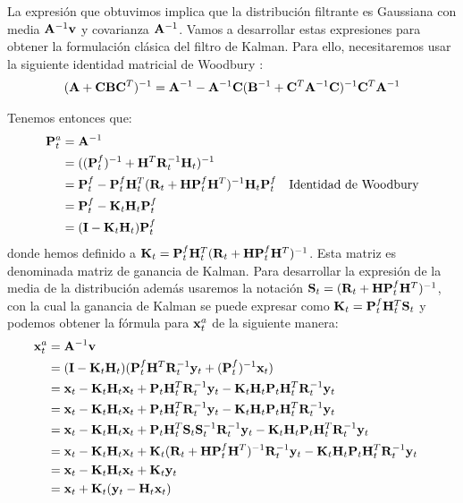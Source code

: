 La expresión que obtuvimos implica que la distribución filtrante es Gaussiana con media $\mathbf{A}^{-1}\mathbf{v}$ y covarianza $\mathbf{A}^{-1}$. Vamos a desarrollar estas expresiones para obtener la formulación clásica del filtro de Kalman. Para ello, necesitaremos usar la siguiente identidad matricial de Woodbury \citep{Golub1996}:
\begin{align*}
    (\mathbf{A} + \mathbf{C} \mathbf{B} \mathbf{C}^T)^{-1} = \mathbf{A}^{-1} - \mathbf{A}^{-1} \mathbf{C} (\mathbf{B}^{-1} + \mathbf{C}^T \mathbf{A}^{-1} \mathbf{C})^{-1} \mathbf{C}^T \mathbf{A}^{-1}
\end{align*}

Tenemos entonces que:
\begin{align*}
    \mathbf{P}_t^a &= \mathbf{A}^{-1} && \\
    &= ((\mathbf{P}_t^f)^{-1} + \mathbf{H}^T \mathbf{R}_t^{-1} \mathbf{H}_t)^{-1} && \\
    &= \mathbf{P}_t^f - \mathbf{P}_t^f \mathbf{H}_t^T (\mathbf{R}_t + \mathbf{H} \mathbf{P}_t^f \mathbf{H}^T)^{-1} \mathbf{H}_t \mathbf{P}_t^f && \text{Identidad de Woodbury}\\
    &= \mathbf{P}_t^f - \mathbf{K}_t \mathbf{H}_t \mathbf{P}_t^f && \\
    &= (\mathbf{I} - \mathbf{K}_t \mathbf{H}_t) \mathbf{P}_t^f && \\
\end{align*}
donde hemos definido a $\mathbf{K}_t = \mathbf{P}_t^f \mathbf{H}_t^T (\mathbf{R}_t + \mathbf{H} \mathbf{P}_t^f \mathbf{H}^T)^{-1}$. Esta matriz es denominada matriz de ganancia de Kalman. Para desarrollar la expresión de la media de la distribución además usaremos la notación $\mathbf{S}_t = (\mathbf{R}_t + \mathbf{H} \mathbf{P}_t^f \mathbf{H}^T)^{-1}$, con la cual la ganancia de Kalman se puede expresar como $\mathbf{K}_t = \mathbf{P}_t^f \mathbf{H}_t^T \mathbf{S}_t$ y podemos obtener la fórmula para $\mathbf{x}_t^a$ de la siguiente manera:
\begin{align*}
    \mathbf{x}_t^a &= \mathbf{A}^{-1} \mathbf{v} && \\
    &= (\mathbf{I} - \mathbf{K}_t \mathbf{H}_t) (\mathbf{P}_t^f \mathbf{H}^T \mathbf{R}_t^{-1} \mathbf{y}_t + (\mathbf{P}_t^{f})^{-1} \mathbf{x}_t) && \\
    &= \mathbf{x}_t - \mathbf{K}_t \mathbf{H}_t \mathbf{x}_t + \mathbf{P}_t \mathbf{H}_t^T \mathbf{R}_t^{-1} \mathbf{y}_t - \mathbf{K}_t \mathbf{H}_t \mathbf{P}_t \mathbf{H}_t^T \mathbf{R}_t^{-1} \mathbf{y}_t && \\
    &= \mathbf{x}_t - \mathbf{K}_t \mathbf{H}_t \mathbf{x}_t + \mathbf{P}_t \mathbf{H}_t^T \mathbf{R}_t^{-1} \mathbf{y}_t - \mathbf{K}_t \mathbf{H}_t \mathbf{P}_t \mathbf{H}_t^T \mathbf{R}_t^{-1} \mathbf{y}_t && \\
    &= \mathbf{x}_t - \mathbf{K}_t \mathbf{H}_t \mathbf{x}_t + \mathbf{P}_t \mathbf{H}_t^T \mathbf{S}_t \mathbf{S}_t^{-1} \mathbf{R}_t^{-1} \mathbf{y}_t - \mathbf{K}_t \mathbf{H}_t \mathbf{P}_t \mathbf{H}_t^T \mathbf{R}_t^{-1} \mathbf{y}_t && \\
    &= \mathbf{x}_t - \mathbf{K}_t \mathbf{H}_t \mathbf{x}_t + \mathbf{K}_t (\mathbf{R}_t + \mathbf{H} \mathbf{P}_t^f \mathbf{H}^T)^{-1} \mathbf{R}_t^{-1} \mathbf{y}_t - \mathbf{K}_t \mathbf{H}_t \mathbf{P}_t \mathbf{H}_t^T \mathbf{R}_t^{-1} \mathbf{y}_t && \\
    &= \mathbf{x}_t - \mathbf{K}_t \mathbf{H}_t \mathbf{x}_t + \mathbf{K}_t \mathbf{y}_t && \\
    &= \mathbf{x}_t + \mathbf{K}_t (\mathbf{y}_t - \mathbf{H}_t \mathbf{x}_t) && \\
\end{align*}
